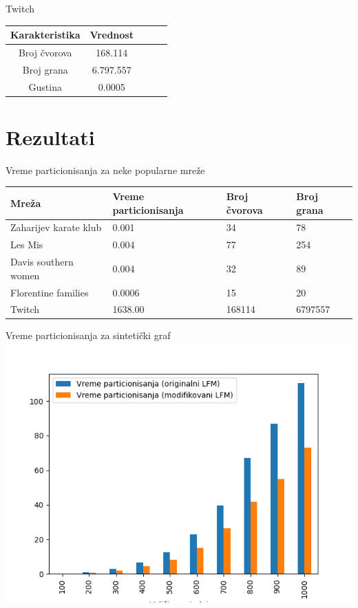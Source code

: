 \documentclass{beamer}
\begin{document}
\begin{frame}{Twitch}
    \centering
    \begin{tabular}{|c|c|c|c|c|}
        \hline
        \textbf{Karakteristika} & \textbf{Vrednost} \\
        \hline
        Broj čvorova & 168.114 \\
        Broj grana & 6.797.557 \\
        Gustina & 0.0005 \\
        \hline
    \end{tabular}
\end{frame}

\section{Rezultati}
\begin{frame}{Vreme particionisanja za neke popularne mreže}
    \centering
    \begin{table}
        \label{tab:4.2}
        \begin{tabular}{lp{1in}p{1in}p{0.5in}}
        Mreža & Vreme particionisanja & Broj čvorova & Broj grana \\
        \hline
        Zaharijev karate klub & 0.001 & 34 & 78 \\
        Les Mis & 0.004 & 77 & 254 \\
        Davis southern women & 0.004 & 32 & 89 \\
        Florentine families & 0.0006 & 15 & 20 \\
        Twitch  & 1638.00 & 168114 & 6797557 \\
    \end{tabular}
\end{table}
\end{frame}
    
\begin{frame}{Vreme particionisanja za sintetički graf}
    \centering
    \includegraphics[height=0.8\textheight]{csv/4.3.png}
\end{frame}
\end{document}

